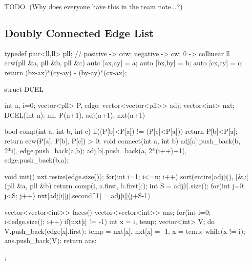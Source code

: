 TODO. (Why does everyone have this in the team note...?)

\subsection{Doubly Connected Edge List}
\begin{cpp}
typedef pair<ll,ll> pll;
// positive -> ccw; negative -> cw; 0 -> collinear
ll ccw(pll &a, pll &b, pll &c){
  auto [ax,ay] = a; auto [bx,by] = b; auto [cx,cy] = c;
  return (bx-ax)*(cy-ay) - (by-ay)*(cx-ax);
}

struct DCEL{
  int n, i=0;
  vector<pll> P, edge;
  vector<vector<pll>> adj;
  vector<int> nxt;
  DCEL(int n): n{n}, P(n+1), adj(n+1), nxt(n+1) {}

  bool comp(int a, int b, int c){
    if((P[b]<P[a]) != (P[c]<P[a])) return P[b]<P[a];
    return ccw(P[a], P[b], P[c]) > 0;
  }
  void connect(int a, int b){
    adj[a].push_back({b, 2*i}), edge.push_back({a,b});
    adj[b].push_back({a, 2*(i++)+1}), edge.push_back({b,a});
  }

  void init(){
    nxt.resize(edge.size());
    for(int i=1; i<=n; i++){
      sort(entire(adj[i]), [&,i](pll &a, pll &b)
        {return comp(i, a.first, b.first);});
      int S = adj[i].size();
      for(int j=0; j<S; j++)
        nxt[adj[i][j].second^1] = adj[i][(j+S-1)%
    }
  }

  vector<vector<int>> faces(){
    vector<vector<int>> ans;
    for(int i=0; i<edge.size(); i++) if(nxt[i] != -1){
      int x = i, temp;
      vector<int> V;
      do{
        V.push_back(edge[x].first);
        temp = nxt[x], nxt[x] = -1, x = temp;
      } while(x != i);
      ans.push_back(V);
    }
    return ans;
  }
};
\end{cpp}